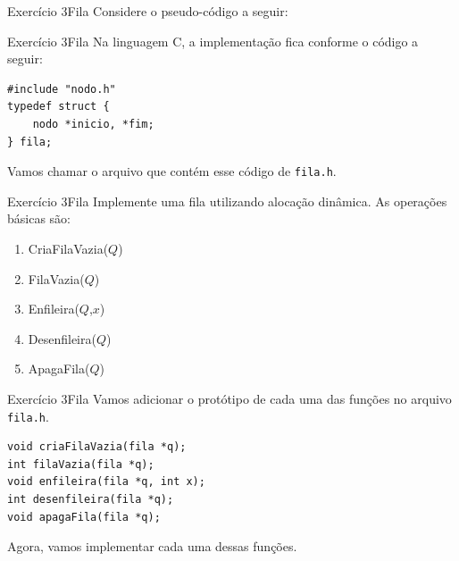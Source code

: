 \documentclass[aspectratio=169]{beamer}
\begin{document}

\begin{frame}[fragile]{Exercício 3}{Fila}
Considere o pseudo-código a seguir:
\begin{algorithm}[H]
\caption{Fila} 
\label{Fila}
\end{algorithm} 
\end{frame}


\begin{frame}[fragile]{Exercício 3}{Fila}
Na linguagem C, a implementação fica conforme o código a seguir:
\begin{lstlisting}[style=CStyle]
#include "nodo.h"
typedef struct {
    nodo *inicio, *fim;
} fila;
\end{lstlisting}  
Vamos chamar o arquivo que contém esse código de \verb|fila.h|.
\end{frame}



\begin{frame}{Exercício 3}{Fila}
Implemente uma fila utilizando alocação dinâmica. As operações básicas são:
\begin{enumerate}
 \item CriaFilaVazia($Q$) 
 \item FilaVazia($Q$)
 \item Enfileira($Q$,$x$)
 \item Desenfileira($Q$) 
 \item ApagaFila($Q$) 
\end{enumerate}
\end{frame}


\begin{frame}[fragile]{Exercício 3}{Fila}
Vamos adicionar o protótipo de cada uma das funções no arquivo \verb|fila.h|.
\begin{lstlisting}[style=CStyle]
void criaFilaVazia(fila *q);
int filaVazia(fila *q);
void enfileira(fila *q, int x);
int desenfileira(fila *q);
void apagaFila(fila *q);
\end{lstlisting}  
Agora, vamos implementar cada uma dessas funções. 
\end{frame}
\end{document}
